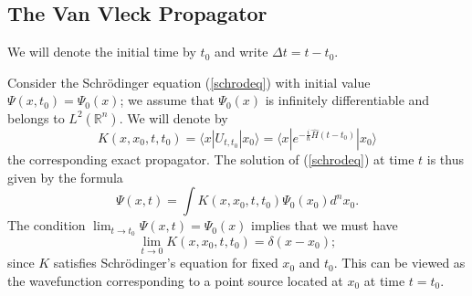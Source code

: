 \documentclass[12pt]{article}%
\begin{document}
\subsection{The Van Vleck Propagator}

We will denote the initial time by $t_{0}$ and write $\Delta t=t-t_{0}$.

Consider the Schr\"{o}dinger equation (\ref{schrodeq}) with initial value
$\Psi(x,t_{0})=\Psi_{0}(x)$; we assume that $\Psi_{0}(x)$ is infinitely
differentiable and belongs to $L^{2}(\mathbb{R}^{n})$. We will denote by
\[
K(x,x_{0},t,t_{0})=\langle x|U_{t,t_{0}}|x_{0}\rangle=\langle x|e^{-\frac
{i}{\hbar}\widehat{H}(t-t_{0})}|x_{0}\rangle
\]
the corresponding exact propagator. The solution of (\ref{schrodeq}) at time
$t$ is thus given by the formula
\begin{equation}
\Psi(x,t)=\int K(x,x_{0},t,t_{0})\Psi_{0}(x_{0})d^{n}x_{0}.\label{kernel}%
\end{equation}
The condition $\lim_{t\rightarrow t_{0}}\Psi(x,t)=\Psi_{0}(x)$ implies that we
must have
\begin{equation}
\lim_{t\rightarrow0}K(x,x_{0},t,t_{0})=\delta(x-x_{0});\label{cond1}%
\end{equation}
since $K$ satisfies Schr\"{o}dinger's equation for fixed $x_{0}$ and $t_{0}$.
This can be viewed as the wavefunction corresponding to a point source located
at $x_{0}$ at time $t=t_{0}$.
\end{document}
